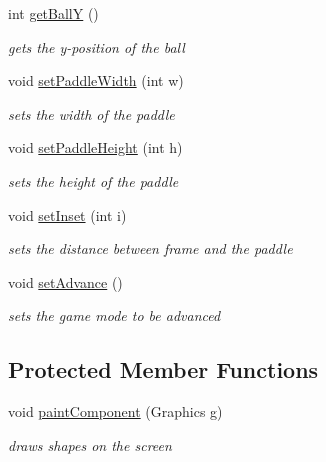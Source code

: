 \begin{DoxyCompactItemize}
int \hyperlink{classview_1_1_pong_game_display_a940198a68c987548b182d18069ba5885}{get\+BallY} ()
\begin{DoxyCompactList}\small\item\em gets the y-\/position of the ball \end{DoxyCompactList}\item 
void \hyperlink{classview_1_1_pong_game_display_ac42d38f9ed29e2ab2bec6c7da46f1c0e}{set\+Paddle\+Width} (int w)
\begin{DoxyCompactList}\small\item\em sets the width of the paddle \end{DoxyCompactList}\item 
void \hyperlink{classview_1_1_pong_game_display_a5c855e1e459838b82e976cd957da5cc5}{set\+Paddle\+Height} (int h)
\begin{DoxyCompactList}\small\item\em sets the height of the paddle \end{DoxyCompactList}\item 
void \hyperlink{classview_1_1_pong_game_display_ac40ce3811b6118c530980d38aa48ec64}{set\+Inset} (int i)
\begin{DoxyCompactList}\small\item\em sets the distance between frame and the paddle \end{DoxyCompactList}\item 
void \hyperlink{classview_1_1_pong_game_display_a0fedbf41897932915b12f67542cb7695}{set\+Advance} ()
\begin{DoxyCompactList}\small\item\em sets the game mode to be advanced \end{DoxyCompactList}\end{DoxyCompactItemize}
\subsection*{Protected Member Functions}
\begin{DoxyCompactItemize}
\item 
void \hyperlink{classview_1_1_pong_game_display_a0e3a18dfc9bbd76c97439a618a3330ac}{paint\+Component} (Graphics g)
\begin{DoxyCompactList}\small\item\em draws shapes on the screen \end{DoxyCompactList}\end{DoxyCompactItemize}
